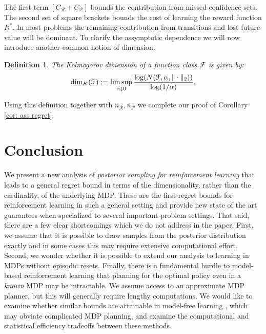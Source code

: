 \documentclass{article}
\newtheorem{mydef}{Definition}
\newcommand{\Pc}{\mathcal{P}}
\newcommand{\Fc}{\mathcal{F}}
\newcommand{\Rc}{\mathcal{R}}
\begin{document}
The first term $[C_\Rc + C_\Pc]$ bounds the contribution from missed confidence sets.
The second set of square brackets bounds the cost of learning the reward function $R^*$.
In most problems the remaining contribution from transitions and lost future value will be dominant.
To clarify the assymptotic dependence we will now introduce another common notion of dimension.
\begin{mydef}
\label{def: kol}
The Kolmogorov dimension of a function class $\Fc$ is given by:
$$ {\rm dim}_K(\Fc) := \limsup_{\alpha \downarrow 0} \frac{\log(N(\Fc,\alpha,\|\cdot\|_2))}{\log(1/\alpha)} .$$
\end{mydef}
Using this definition together with $n_\Rc,n_\Pc$ we complete our proof of Corollary \ref{cor: ass regret}.


\section{Conclusion}
We present a new analysis of \emph{posterior sampling for reinforcement learning} that leads to a general regret bound in terms of the dimensionality, rather than the cardinality, of the underlying MDP.
These are the first regret bounds for reinforcement learning in such a general setting and provide new state of the art guarantees when specialized to several important problem settings.
That said, there are a few clear shortcomings which we do not address in the paper.
First, we assume that it is possible to draw samples from the posterior distribution exactly and in some cases this may require extensive computational effort.
Second, we wonder whether it is possible to extend our analysis to learning in MDPs without episodic resets.
Finally, there is a fundamental hurdle to model-based reinforcement learning that planning for the optimal policy even in a \emph{known} MDP may be intractable.
We assume access to an approximate MDP planner, but this will generally require lengthy computations.
We would like to examine whether similar bounds are attainable in model-free learning \cite{van2014generalization}, which may obviate complicated MDP planning, and examine the computational and statistical efficiency tradeoffs between these methods.


\newpage
\small{


}
\newpage
\end{document}
